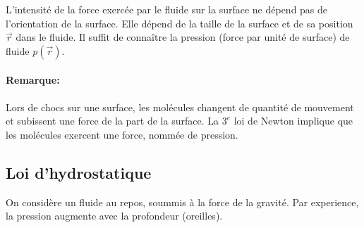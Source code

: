 \documentclass[
    11pt,
    a4paper,
    oneside,
    headinlcude, footinclude,
    twoside,
]{report}
\renewcommand{\vec}[1]{\overrightarrow{#1}}
\begin{document}
L'intensité de la force exercée par le fluide sur la surface ne dépend pas de
l'orientation de la surface. Elle dépend de la taille de la surface et de sa
position $\vec r$ dans le fluide. Il suffit de conna\^itre la pression (force
par unité de surface) de fluide $p(\vec r)$.

\paragraph{Remarque:}

Lors de chocs sur une surface, les molécules changent de quantité de mouvement
et subissent une force de la part de la surface. La $3^{e}$ loi de Newton
implique que les molécules exercent une force, nommée de pression.

\subsection{Loi d'hydrostatique}
\label{sub:loi_d_hydrostatique}

On considère un fluide au repos, soummis à la force de la gravité. Par
experience, la pression augmente avec la profondeur (oreilles).
\end{document}

